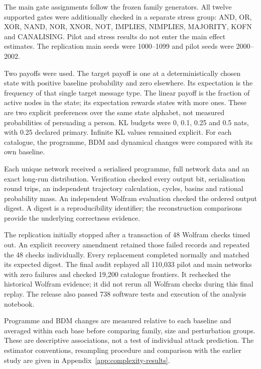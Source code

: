 \documentclass[11pt,a4paper]{article}
\begin{document}
The main gate assignments follow the frozen family generators. All twelve
supported gates were additionally checked in a separate stress group:
AND, OR, XOR, NAND, NOR, XNOR, NOT, IMPLIES, NIMPLIES, MAJORITY, KOFN and
CANALISING. Pilot and stress results do not enter the main effect estimates.
The replication main seeds were 1000--1099 and pilot seeds were 2000--2002.

Two payoffs were used. The target payoff is one at a deterministically
chosen state with positive baseline probability and zero elsewhere.
Its expectation is the frequency of that single target message type.
The linear payoff is the fraction of active nodes in the state; its
expectation rewards states with more ones. These are two explicit
preferences over the same state alphabet, not measured probabilities
of persuading a person. KL budgets were 0, 0.1, 0.25 and
0.5 nats, with 0.25 declared primary. Infinite KL values remained explicit.
For each catalogue, the programme, BDM and dynamical changes were compared
with its own baseline.

Each unique network received a serialised programme, full network data and
an exact long-run distribution. Verification checked every output bit,
serialisation round trips, an independent trajectory calculation, cycles,
basins and rational probability mass. An independent Wolfram evaluation
checked the ordered output digest. A digest is a reproducibility identifier;
the reconstruction comparisons provide the underlying correctness evidence.

The replication initially stopped after a transaction of 48 Wolfram checks
timed out. An explicit recovery amendment retained those failed records and
repeated the 48 checks individually. Every replacement completed normally
and matched its expected digest. The final audit replayed all 110,033 pilot
and main networks with zero failures and checked 19,200 catalogue frontiers.
It rechecked the historical Wolfram evidence; it did not rerun all Wolfram
checks during this final replay. The release also passed 738 software tests
and execution of the analysis notebook.

Programme and BDM changes are measured relative to each baseline and
averaged within each base before comparing family, size and perturbation
groups. These are descriptive associations, not a test of individual
attack prediction. The estimator conventions, resampling procedure and
comparison with the earlier study are given in
Appendix~\ref{app:complexity-results}.
\end{document}
